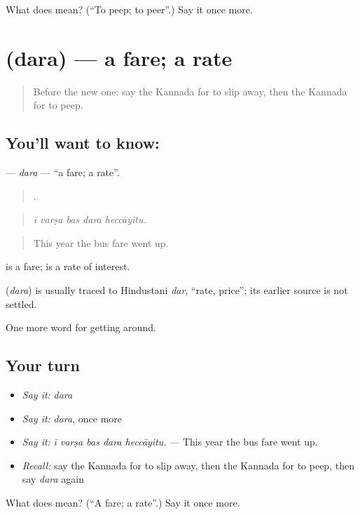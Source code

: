 \begin{tcolorbox}[breakable,colback=teal!4,colframe=teal!35!black,title={Before you move on}]
What does  mean? (\textquotedblleft{}To peep; to peer\textquotedblright{}.) Say it once more.
\end{tcolorbox}
\section[\texorpdfstring{\kn{ದರ} (dara)}{ದರ (dara)}]{ (dara) — a fare; a rate}

\label{lesson:KA-C435-dara}



\begin{quote}
Before the new one: say the Kannada for to slip away, then the Kannada for to peep.
\end{quote}

\subsection*{You'll want to know: }
\textbf{} — \emph{dara} — \textquotedblleft{}a fare; a rate\textquotedblright{}.

\begin{quote}
    .
\end{quote}

\begin{quote}
\emph{ī varṣa bas dara heccāyitu.}
\end{quote}

\begin{quote}
This year the bus fare went up.
\end{quote}

  is a fare;   is a rate of interest.

\begin{cousinweb}
\textbf{} (\emph{dara}) is usually traced to Hindustani \emph{dar}, \textquotedblleft{}rate, price\textquotedblright{}; its earlier source is not settled.
\end{cousinweb}

\begin{grammarlens}[title={What you've built}]
One more word for getting around.
\end{grammarlens}

\subsection*{Your turn}
\begin{itemize}
\raggedright
  \item \emph{Say it:} \emph{dara}
  \item \emph{Say it:} \emph{dara}, once more
  \item \emph{Say it:} \emph{ī varṣa bas dara heccāyitu.} — This year the bus fare went up.
  \item \emph{Recall:} say the Kannada for to slip away, then the Kannada for to peep, then say \emph{dara} again
\end{itemize}

\begin{tcolorbox}[breakable,colback=teal!4,colframe=teal!35!black,title={Before you move on}]
What does  mean? (\textquotedblleft{}A fare; a rate\textquotedblright{}.) Say it once more.
\end{tcolorbox}
